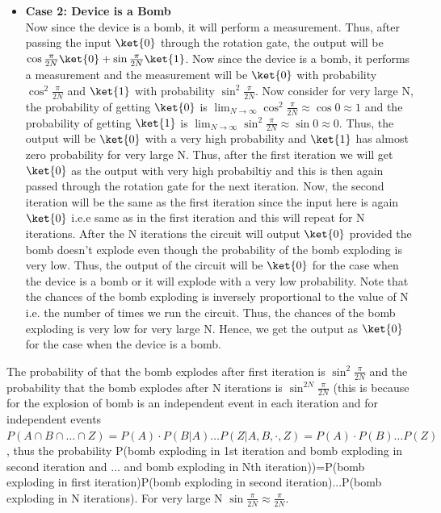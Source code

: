 \documentclass[12pt, oneside]{book}
\theoremstyle{definition}
\theoremstyle{definition}
\theoremstyle{remark}
\begin{document}
\begin{enumerate}
\begin{itemize}
        \item \textbf{Case 2: Device is a Bomb}\\
        Now since the device is a bomb, it will perform a measurement. Thus, after passing the input $\ket{0}$ through the rotation gate, the output will be $\cos\frac{\pi}{2N}\ket{0}+\sin\frac{\pi}{2N}\ket{1}$.
        Now since the device is a bomb, it performs a measurement and the measurement will be $\ket{0}$ with probability $\cos^2\frac{\pi}{2N}$ and $\ket{1}$ with probability $\sin^2\frac{\pi}{2N}$. Now consider for very large N,
        the probability of getting $\ket{0}$ is $\lim_{N\rightarrow \infty} \cos^2\frac{\pi}{2N}\approx \cos 0 \approx 1$ and the probability of getting $\ket{1}$ is $\lim_{N\rightarrow \infty} \sin^2\frac{\pi}{2N}\approx \sin 0 \approx 0$. Thus, the output will be $\ket{0}$ with a very high probability and $\ket{1}$ has almost zero probability for very large N.
        Thus, after the first iteration we will get $\ket{0}$ as the output with very high probabiltiy and this is then again passed through the rotation gate for the next iteration. Now, the second iteration will be the same as the first iteration since the input here is again $\ket{0}$ i.e.e same as in the first iteration and this will repeat for N iterations. 
        After the N iterations the circuit will output $\ket{0}$ provided the bomb doesn't explode even though the probability of the bomb exploding is very low. Thus, the output of the circuit will be $\ket{0}$ for the case when the device is a bomb or it will explode with a very low probability. Note that the chances of the bomb exploding is inversely proportional to the 
        value of N i.e. the number of times we run the circuit. Thus, the chances of the bomb exploding is very low for very large N. Hence, we get the output as $\ket{0}$ for the case when the device is a bomb.
    \end{itemize}
    The probability of that the bomb explodes after first iteration is $\sin^2 \frac{\pi}{2N}$ and the probability that the bomb explodes after N iterations is $\sin^{2N} \frac{\pi}{2N}$ (this is because for the explosion of bomb is an independent event in each iteration and for independent events $P(A\cap B \cap \ldots \cap Z)=P(A)\cdot P(B|A)\ldots P(Z|A,B,\cdot,Z)=P(A)\cdot P(B)\ldots P(Z)$, 
    thus the probability P(bomb exploding in 1st iteration and bomb exploding in second iteration and ... and bomb exploding in Nth iteration))=P(bomb exploding in first iteration)P(bomb exploding in second iteration)...P(bomb exploding in N iterations). For very large N $\sin \frac{\pi}{2N} \approx \frac{\pi}{2N}$.

\end{enumerate}
\end{document}
